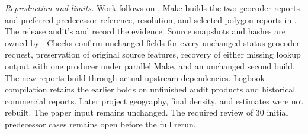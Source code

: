 \textit{Reproduction and limits.} Work follows  on
. Make builds the two geocoder reports and preferred
predecessor reference, resolution, and selected-polygon reports in
. The release audit's
 and 
record the evidence. Source snapshots and hashes are owned by
. Checks confirm unchanged fields
for every unchanged-status geocoder request, preservation of original source
features, recovery of either missing lookup output with one producer under parallel
Make, and an unchanged second build. The new reports build through actual upstream
dependencies. Logbook compilation retains the earlier holds on unfinished audit
products and historical commercial reports. Later project geography, final density,
and estimates were not rebuilt. The paper input remains unchanged. The required
review of 30 initial predecessor cases remains open before the full rerun.
